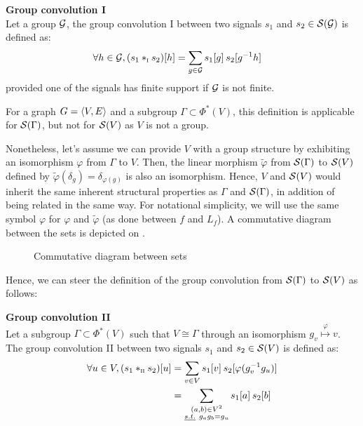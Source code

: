 \begin{definition}\textbf{Group convolution I}\\
Let a group $\group$, the group convolution I between two signals $s_1$ and $s_2 \in \cs(\group)$ is defined as:
\begin{align*}
\forall h \in \group, (s_1 \ast_{\I} s_2)[h] & = \displaystyle \sum_{g \in \group} s_1[g] \h{2} s_2[g^{-1}h]%
\end{align*}
provided one of the signals has finite support if $\group$ is not finite.
\label{def:conv1}
\end{definition}

For a graph $\gve$ and a subgroup $\Gamma \subset \Phi^*(V)$, this definition is applicable for $\cs(\Gamma)$, but not for $\cs(V)$ as $V$ is not a group.

Nonetheless, let's assume we can provide $V$ with a group structure by exhibiting an isomorphism $\varphi$ from $\Gamma$ to $V$. Then, the linear morphism $\widetilde\varphi$ from $\cs(\Gamma)$ to $\cs(V)$ defined by $\widetilde\varphi(\delta_g) = \delta_{\varphi(g)}$ is also an isomorphism. Hence, $V$ and $\cs(V)$ would inherit the same inherent structural properties as $\Gamma$ and $\cs(\Gamma)$, in addition of being related in the same way. For notational simplicity, we will use the same symbol $\varphi$ for $\varphi$ and $\widetilde\varphi$ (as done between $f$ and $L_f$). A commutative diagram between the sets is depicted on .

\begin{figure}[H]
\centering
{}%
\caption{Commutative diagram between sets}
\label{fig:iso}
\end{figure}

Hence, we can steer the definition of the group convolution from $\cs(\Gamma)$ to $\cs(V)$ as follows:

\begin{definition}\textbf{Group convolution II}\\
Let a subgroup $\Gamma \subset \Phi^*(V)$ such that $V \cong \Gamma$ through an isomorphism $g_v \overset{\varphi}\mapsto v$.
The group convolution II between two signals $s_1$ and $s_2 \in \cs(V)$ is defined as:
\begin{align*}
\forall u \in V, (s_1 \ast_{\II} s_2) [u] & = \displaystyle \sum_{v \in V} s_1[v] \h{2} s_2[\varphi(g_v^{-1}g_u)]\\
& = \displaystyle \sum_{\substack{(a,b) \in V^2 \\ \st g_ag_b=g_u }} s_1[a] \h{2} s_2[b]
\end{align*}
\label{def:conv2}
\end{definition}

